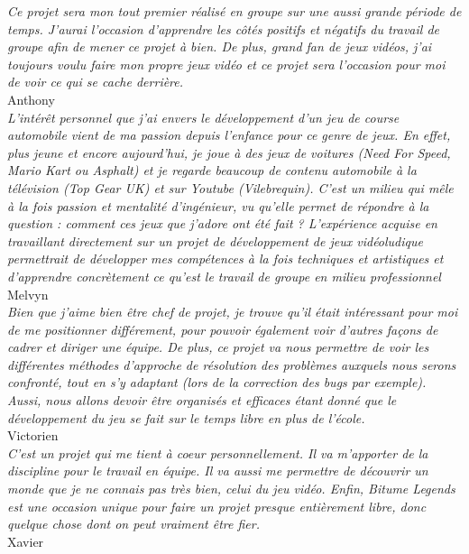 \documentclass[12pt,a4paper]{article}
\begin{document}
  \indent\textit{Ce projet sera mon tout premier réalisé en groupe sur une aussi grande période de temps. 
    J'aurai l'occasion d'apprendre les côtés positifs et négatifs du travail de groupe afin de mener ce 
    projet à bien. De plus, grand fan de jeux vidéos, j'ai toujours voulu faire mon propre jeux vidéo et ce 
    projet sera l'occasion pour moi de voir ce qui se cache derrière.} \\
  \indent Anthony\\[0.3cm]
  \indent\textit{L'intérêt personnel que j'ai envers le développement d'un jeu de course automobile vient de ma 
    passion depuis l'enfance pour ce genre de jeux. En effet, plus jeune et encore aujourd'hui, je joue
    à des jeux de voitures (Need For Speed, Mario Kart ou Asphalt) et je regarde beaucoup de contenu automobile
    à la télévision (Top Gear UK) et sur Youtube (Vilebrequin). C'est un milieu qui mêle à la fois passion et 
    mentalité d'ingénieur, vu qu'elle permet de répondre à la question : comment ces jeux que j'adore ont été 
    fait ? L'expérience acquise en travaillant directement sur un projet de développement de jeux vidéoludique 
    permettrait de développer mes compétences à la fois techniques et artistiques et d'apprendre concrètement 
    ce qu'est le travail de groupe en milieu professionnel} \\
  \indent Melvyn\\[0.3cm]
  \indent\textit{Bien que j'aime bien être chef de projet, je trouve qu'il était intéressant 
    pour moi de me positionner différement, pour pouvoir également voir d'autres façons 
    de cadrer et diriger une équipe. De plus, ce projet va nous permettre de voir les différentes
    méthodes d'approche de résolution des problèmes auxquels nous serons confronté, tout en s'y
    adaptant (lors de la correction des bugs par exemple). Aussi, nous allons devoir être organisés
    et efficaces étant donné que le développement du jeu se fait sur le temps libre en plus de l'école.} \\
  \indent Victorien\\[0.3cm]
  \indent\textit{C'est un projet qui me tient à coeur personnellement. Il va m'apporter de la discipline pour le travail
    en équipe. Il va aussi me permettre de découvrir un monde que je ne connais pas très bien, celui du jeu vidéo.
    Enfin, Bitume Legends est une occasion unique pour faire un projet presque entièrement libre, donc quelque
    chose dont on peut vraiment être fier.} \\
  \indent Xavier
\clearpage
\end{document}
